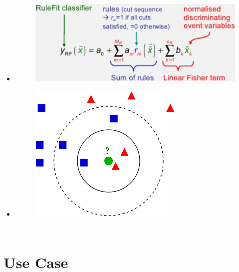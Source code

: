 \documentclass{beamer}\usepackage[]{graphicx}\usepackage[]{color}
\begin{document}
\begin{frame}[fragile]
\begin{columns}[c]
\begin{itemize}
\item[] 
\begin{figure}
	\includegraphics[width=0.6\linewidth]{rulefit.png}
\end{figure}
\item[] \begin{figure}
	\includegraphics[width=0.15\linewidth]{knn.png}
\end{figure}
\end{itemize}
\end{columns}
\end{frame}
\section{Use Case} %
\end{document}

